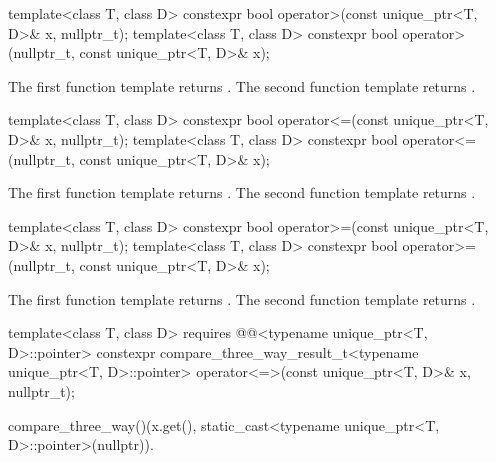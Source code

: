%
\begin{itemdecl}
template<class T, class D>
  constexpr bool operator>(const unique_ptr<T, D>& x, nullptr_t);
template<class T, class D>
  constexpr bool operator>(nullptr_t, const unique_ptr<T, D>& x);
\end{itemdecl}

\begin{itemdescr}
\pnum
\returns
The first function template returns .
The second function template returns .
\end{itemdescr}

%
\begin{itemdecl}
template<class T, class D>
  constexpr bool operator<=(const unique_ptr<T, D>& x, nullptr_t);
template<class T, class D>
  constexpr bool operator<=(nullptr_t, const unique_ptr<T, D>& x);
\end{itemdecl}

\begin{itemdescr}
\pnum
\returns
The first function template returns .
The second function template returns .
\end{itemdescr}

%
\begin{itemdecl}
template<class T, class D>
  constexpr bool operator>=(const unique_ptr<T, D>& x, nullptr_t);
template<class T, class D>
  constexpr bool operator>=(nullptr_t, const unique_ptr<T, D>& x);
\end{itemdecl}

\begin{itemdescr}
\pnum
\returns
The first function template returns .
The second function template returns .
\end{itemdescr}

%
\begin{itemdecl}
template<class T, class D>
  requires @@<typename unique_ptr<T, D>::pointer>
  constexpr compare_three_way_result_t<typename unique_ptr<T, D>::pointer>
    operator<=>(const unique_ptr<T, D>& x, nullptr_t);
\end{itemdecl}

\begin{itemdescr}
\pnum
\returns
\begin{codeblock}
compare_three_way()(x.get(), static_cast<typename unique_ptr<T, D>::pointer>(nullptr)).
\end{codeblock}
\end{itemdescr}

